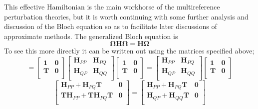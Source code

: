 \documentclass[12pt]{article}
\begin{document}
\noindent This effective Hamiltonian is the main workhorse of the multireference perturbation theories, but it is worth
continuing with some further analysis and discussion of the Bloch equation so as to facilitate later
discussions of approximate methods. The generalized Bloch equation is  
\begin{equation}
\boldsymbol{\Omega}\mathbf{H}\boldsymbol{\Omega} =
\mathbf{H}\boldsymbol{\Omega}
\label{eqn:GeneralizedBloch}
\end{equation}
To see this more directly it can be written out using the matrices specified above;
\begin{equation*}
=
\begin{bmatrix}
\mathbf{1} & \mathbf{0} \\ 
\mathbf{T} & \mathbf{0} \\ 
\end{bmatrix}
\begin{bmatrix}
 \mathbf{H}_{PP} & \mathbf{H}_{PQ} \\ 
 \mathbf{H}_{QP} & \mathbf{H}_{QQ} \\ 
\end{bmatrix}
\begin{bmatrix}
\mathbf{1} & \mathbf{0} \\ 
\mathbf{T} & \mathbf{0} \\ 
\end{bmatrix}
=
\begin{bmatrix}
 \mathbf{H}_{PP} & \mathbf{H}_{PQ} \\ 
 \mathbf{H}_{QP} & \mathbf{H}_{QQ} \\ 
\end{bmatrix}
\begin{bmatrix}
\mathbf{1} & \mathbf{0} \\ 
\mathbf{T} & \mathbf{0} \\ 
\end{bmatrix}
\end{equation*}
\begin{equation*}
\begin{bmatrix}
 \mathbf{H}_{PP} + \mathbf{H}_{PQ}\mathbf{T}& \mathbf{0} \\ 
 \mathbf{T}\mathbf{H}_{PP} + \mathbf{T}\mathbf{H}_{PQ}\mathbf{T}& \mathbf{0} \\ 
\end{bmatrix}
=
\begin{bmatrix}
 \mathbf{H}_{PP} + \mathbf{H}_{PQ}\mathbf{T} & \mathbf{0} \\ 
 \mathbf{H}_{QP} + \mathbf{H}_{QQ}\mathbf{T} & \mathbf{0} \\ 
\end{bmatrix}
\label{eqn:BlochGenMat}
\end{equation*}
\end{document}
